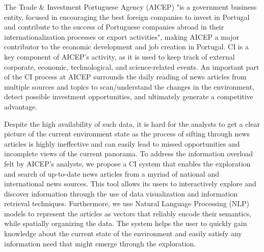 \documentclass[a4paper]{article}
\begin{document}
The Trade \& Investment Portuguese Agency (AICEP) "is a government business entity, focused in encouraging the best foreign companies to invest in Portugal and contribute to the success of Portuguese companies abroad in their internationalization processes or export activities", making AICEP a major contributor to the economic development and job creation in Portugal. CI is a key component of AICEP's activity, as it is used to keep track of external corporate, economic, technological, and science-related events. An important part of the CI process at AICEP surrounds the daily reading of news articles from multiple sources and topics to scan/understand the changes in the environment, detect possible investment opportunities, and ultimately generate a competitive advantage. 

Despite the high availability of such data, it is hard for the analysts to get a clear picture of the current environment state as the process of sifting through news articles is highly ineffective and can easily lead to missed opportunities and incomplete views of the current panorama. To address the information overload felt by AICEP's analysts, we propose a CI system that enables the exploration and search of up-to-date news articles from a myriad of national and international news sources. This tool allows its users to interactively explore and discover information through the use of data visualization and information retrieval techniques. Furthermore, we use Natural Language Processing (NLP) models to represent the articles as vectors that reliably encode their semantics, while spatially organizing the data. The system helps the user to quickly gain knowledge about the current state of the environment and easily satisfy any information need that might emerge through the exploration.

\end{document}
